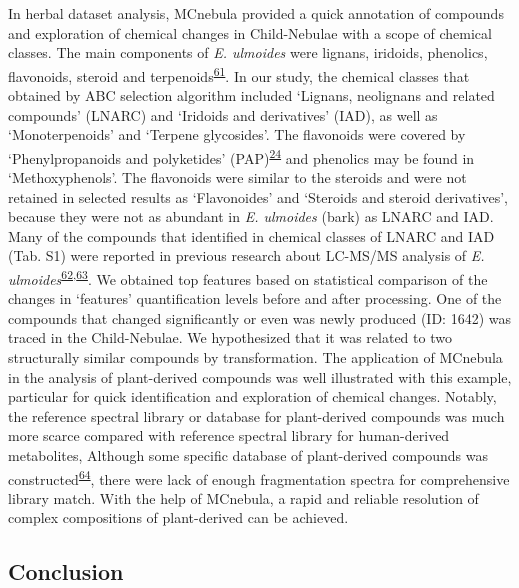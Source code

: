 \documentclass[
]{article}
\begin{document}
In herbal dataset analysis, MCnebula provided a quick annotation of
compounds and exploration of chemical changes in Child-Nebulae with a
scope of chemical classes. The main components of \emph{E. ulmoides}
were lignans, iridoids, phenolics, flavonoids, steroid and
terpenoids\textsuperscript{\protect\hyperlink{ref-huang_traditional_2021}{61}}.
In our study, the chemical classes that obtained by ABC selection
algorithm included `Lignans, neolignans and related compounds' (LNARC)
and `Iridoids and derivatives' (IAD), as well as `Monoterpenoids' and
`Terpene glycosides'. The flavonoids were covered by `Phenylpropanoids
and polyketides' (PAP)\textsuperscript{\protect\hyperlink{ref-2016}{24}}
and phenolics may be found in `Methoxyphenols'. The flavonoids were
similar to the steroids and were not retained in selected results as
`Flavonoides' and `Steroids and steroid derivatives', because they were
not as abundant in \emph{E. ulmoides} (bark) as LNARC and IAD. Many of
the compounds that identified in chemical classes of LNARC and IAD (Tab.
S1) were reported in previous research about LC-MS/MS analysis of
\emph{E.
ulmoides}\textsuperscript{\protect\hyperlink{ref-2014w}{62},\protect\hyperlink{ref-2015v}{63}}.
We obtained top features based on statistical comparison of the changes
in `features' quantification levels before and after processing. One of
the compounds that changed significantly or even was newly produced (ID:
1642) was traced in the Child-Nebulae. We hypothesized that it was
related to two structurally similar compounds by transformation. The
application of MCnebula in the analysis of plant-derived compounds was
well illustrated with this example, particular for quick identification
and exploration of chemical changes. Notably, the reference spectral
library or database for plant-derived compounds was much more scarce
compared with reference spectral library for human-derived metabolites,
Although some specific database of plant-derived compounds was
constructed\textsuperscript{\protect\hyperlink{ref-2012ac}{64}}, there
were lack of enough fragmentation spectra for comprehensive library
match. With the help of MCnebula, a rapid and reliable resolution of
complex compositions of plant-derived can be achieved.

\hypertarget{conclusion}{%
\subsection{Conclusion}\label{conclusion}}
\end{document}
